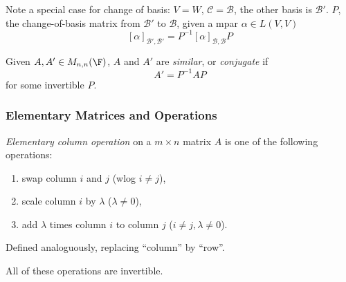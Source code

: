 \documentclass[a4paper]{article}
\newcommand*{\basis}{\mathcal}
\theoremstyle{definition}
\begin{document}
Note a special case for change of basis: \(V=W\), \(\basis C=\basis B\), the other basis is \(\basis B'\). \(P\), the change-of-basis matrix from \(\basis B'\) to \(\basis B\), given a mpar \(\alpha \in L(V,V)\)
\[
  [\alpha]_{\basis B',\basis B'} = P^{-1}[\alpha]_{\basis B,\basis B}P
\]

\begin{definition}
  Given \(A, A' \in M_{n,n}(\F)\), \(A\) and \(A'\) are \emph{similar}, or \emph{conjugate} if
  \[
    A' = P^{-1}AP
  \]
  for some invertible \(P\).
\end{definition}

\subsubsection{Elementary Matrices and Operations}

\begin{definition}
  \emph{Elementary column operation} on a \(m\times n\) matrix \(A\) is one of the following operations:
  \begin{enumerate}
  \item swap column \(i\) and \(j\) (wlog \(i\neq j\)),
  \item scale column \(i\) by \(\lambda\)  (\(\lambda\neq0\)),
  \item add \(\lambda\) times column \(i\) to column \(j\) (\(i\neq j,\lambda\neq 0\)).
  \end{enumerate}
\end{definition}

\begin{definition}
  Defined analoguously, replacing ``column'' by ``row''.
\end{definition}

\begin{note}
  All of these operations are invertible.
\end{note}
\end{document}
